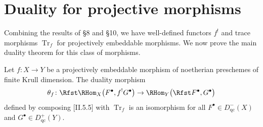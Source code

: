 
\setcounter{page}{210}
\section{Duality for projective morphisms}

Combining the results of \S8 and \S10, we have well-defined functors $f^!$ and trace morphisms $\operatorname{Tr}_f$ for projectively embeddable morphisms. We now prove the main duality theorem for this class of morphisms.

\begin{theorem}
Let $f\colon X\to Y$ be a projectively embeddable morphism of noetherian preschemes of finite Krull dimension. The duality morphism
\[
\theta_{f}\colon
\Rfst \RHom_X\bigl(F^\bullet,f^! G^\bullet\bigr)
\to \RHom_Y\bigl(\Rfst F^\bullet,G^\bullet\bigr)
\]
defined by composing [II.5.5] with $\operatorname{Tr}_f$ is an isomorphism for all $F^\bullet\in D_{\mathrm{qc}}^-(X)$ and $G^\bullet\in D_{\mathrm{qc}}^+(Y)$.
\end{theorem}

